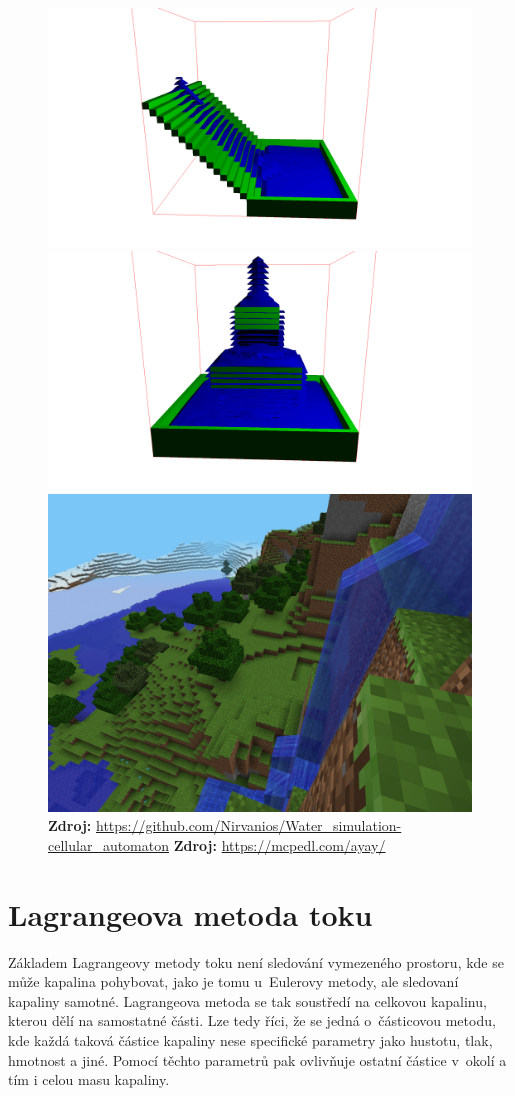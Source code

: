 \begin{figure}[h!]\centering
	\centering
	\captionsetup{justification=centering}
	\includegraphics[width=0.5\linewidth]{obrazky-figures/cellular1.png}\hfill
	\includegraphics[width=0.5\linewidth]{obrazky-figures/cellular2.png}\hfill
	\includegraphics[width=0.4\linewidth]{obrazky-figures/miecraft.jpg}\hfill
	\textbf{Zdroj: } \url{https://github.com/Nirvanios/Water_simulation-cellular_automaton} 
	\textbf{Zdroj: } \url{https://mcpedl.com/ayay/}
	\label{fig:celular}
\end{figure}

\section{Lagrangeova metoda toku}
Základem Lagrangeovy metody toku není sledování vymezeného prostoru, kde se může kapalina pohybovat, jako je tomu u~Eulerovy metody, ale sledovaní kapaliny samotné. Lagrangeova metoda se tak soustředí na celkovou kapalinu, kterou dělí na samostatné části. Lze tedy říci, že se jedná o~částicovou metodu, kde každá taková částice kapaliny nese specifické parametry jako hustotu, tlak, hmotnost a jiné. Pomocí těchto parametrů pak ovlivňuje ostatní částice v~okolí a tím i celou masu kapaliny.

